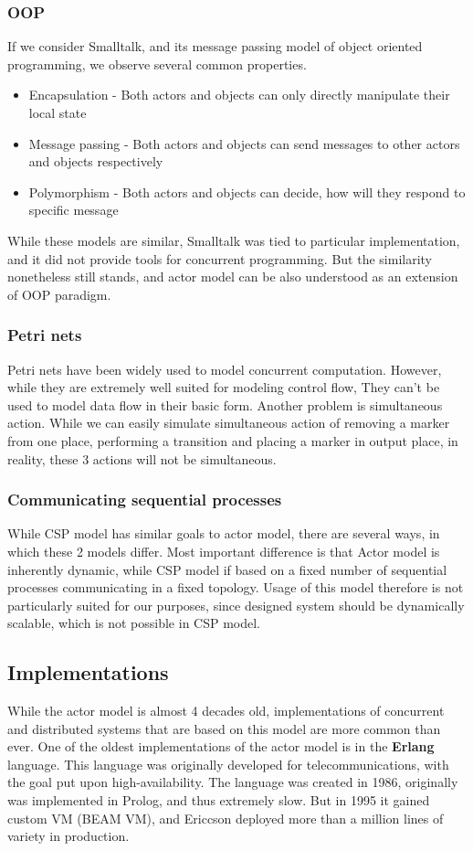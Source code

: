 \subsubsection{OOP}
If we consider Smalltalk, and its message passing model of object oriented programming, we observe several common properties.
\begin{itemize}
    \item Encapsulation - Both actors and objects can only directly manipulate their local state
    \item Message passing - Both actors and objects can send messages to other actors and objects respectively
    \item Polymorphism - Both actors and objects can decide, how will they respond to specific message
\end{itemize}

While these models are similar, Smalltalk was tied to particular implementation, and it did not provide
tools for concurrent programming. But the similarity nonetheless still stands, and actor model can be also understood as
an extension of OOP paradigm.

\subsubsection{Petri nets}
Petri nets have been widely used to model concurrent computation. However, while they are extremely well suited
for modeling control flow, They can't be used to model data flow in their basic form. Another problem is
simultaneous action. While we can easily simulate simultaneous action of removing a marker from one place, performing
a transition and placing a marker in output place, in reality, these 3 actions will not be simultaneous.

\subsubsection{Communicating sequential processes}
While CSP model has similar goals to actor model, there are several ways, in which these 2 models differ.
Most important difference is that Actor model is inherently
dynamic, while CSP model if based on a fixed number of sequential processes communicating in a fixed topology\cite{Hoare:1985:CSP:3921}.
Usage of this model therefore is not particularly suited for our purposes, since designed system should be dynamically scalable,
which is not possible in CSP model.

\subsection{Implementations}
While the actor model is almost 4 decades old, implementations of concurrent and distributed systems that
are based on this model are more common than ever. One of the oldest implementations of the actor model is in the
\textbf{Erlang} language. This language was originally developed for telecommunications, with the goal put upon
high-availability. The language was created in 1986, originally was implemented in Prolog, and thus extremely slow.
But in 1995 it gained custom VM (BEAM VM), and Ericcson deployed more than a million lines of variety in production.


